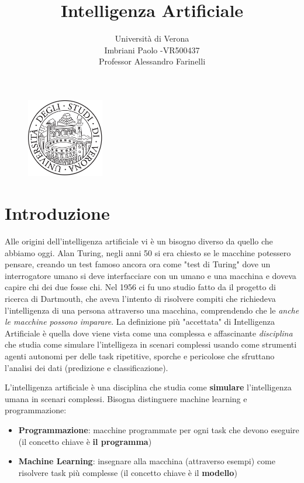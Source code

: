 \documentclass[a4paper]{article}
\title{Intelligenza Artificiale}
\author{Università di Verona\\Imbriani Paolo -VR500437\\Professor Alessandro Farinelli}
\begin{document}
\begin{figure}
    \centering
    \includegraphics[width=0.3\textwidth]{../UniversityofVerona.png}
    \label{fig:centered-image}
\end{figure}

\maketitle

\pagebreak

\tableofcontents

\pagebreak

\section{Introduzione}

Alle origini dell'intelligenza artificiale vi è un bisogno diverso da quello che abbiamo oggi.
Alan Turing, negli anni 50 si era chiesto se le macchine potessero pensare, creando un test famoso ancora ora 
come "test di Turing" dove un interrogatore umano si deve interfacciare con un umano e una macchina 
e doveva capire chi dei due fosse chi. 
Nel 1956 ci fu uno studio fatto da il progetto di ricerca di Dartmouth, che aveva l'intento
di risolvere compiti che richiedeva l'intelligenza di una persona attraverso una macchina,
comprendendo che le \textit{anche le macchine possono imparare}.
La definizione più "accettata" di Intelligenza Artificiale è quella dove viene vista come una 
complessa e affascinante \textit{disciplina} che studia come simulare l'intelligeza in scenari complessi usando come
strumenti agenti autonomi per delle task ripetitive, sporche e pericolose che sfruttano l'analisi dei dati
(predizione e classificazione).

\dfn{}
{
    L'intelligenza artificiale è una disciplina che studia come \textbf{simulare} l'intelligenza
    umana in scenari complessi.
}
\noindent
Bisogna distinguere machine learning e programmazione:
\begin{itemize}
    \item \textbf{Programmazione}: macchine programmate per ogni task che devono eseguire (il concetto chiave
    è \textbf{il programma})
    \item \textbf{Machine Learning}: insegnare alla macchina (attraverso esempi) come risolvere task più complesse (il concetto chiave 
    è il \textbf{modello})
\end{itemize}
\end{document}
